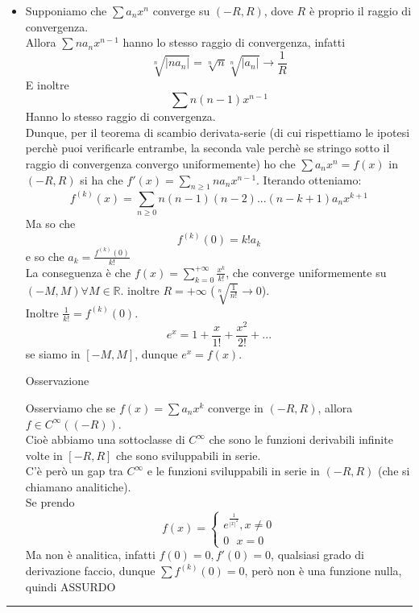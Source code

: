 \documentclass{article}
\theoremstyle{definition}
\newcommand{\linea}{\vspace{15pt}\hrule\vspace{15pt}}
\newcommand{\R}{\mathbb{R}}
\begin{document}
\begin{itemize}
    \item Supponiamo che $\sum a_nx^n$ converge su $(-R,R)$, dove $R$ è proprio il raggio di convergenza.\\
Allora $\sum na_nx^{n-1}$ hanno lo stesso raggio di convergenza, infatti
\begin{equation}
    \sqrt[n]{|na_n|}=\sqrt[n]{n}\sqrt[n]{|a_n|} \to \frac{1}{R}
\end{equation}
E inoltre
\begin{equation}
    \sum n(n-1)x^{n-1}
\end{equation}
Hanno lo stesso raggio di convergenza.
\\
Dunque, per il teorema di scambio derivata-serie (di cui rispettiamo le ipotesi perchè puoi verificarle entrambe, la seconda vale perchè se stringo sotto il raggio di convergenza convergo uniformemente) ho che $\sum a_nx^n = f(x)$ in $(-R,R)$ si ha che $f'(x)=\sum_{n \geqslant 1} n a_nx^{n-1}$. Iterando otteniamo:
\begin{equation}
    f^{(k)}(x)=\sum_{n \geqslant 0} n(n-1)(n-2)...(n-k+1)a_nx^{k+1}
\end{equation}
Ma so che 
\begin{equation}
    f^{(k)}(0)=k!a_k
\end{equation}
e so che $a_k=\frac{f^{(k)}(0)}{k!}$
\\
La conseguenza è che $f(x)=\sum_{k=0}^{+\infty}\frac{x^k}{k!}$, che converge uniformemente su $(-M,M) \forall M \in \R$. inoltre $R = +\infty$ ($\sqrt[n]{\frac{1}{n!}} \to 0$).
\\
Inoltre $\frac{1}{k!}=f^{(k)}(0)$.
\\
\begin{equation}
    e^x = 1+ \frac{x}{1!}+\frac{x^2}{2!}+...
\end{equation}
se siamo in $[-M,M]$, dunque $e^x=f(x)$.



\begin{center}
    Osservazione
\end{center}
Osserviamo che se $f(x)=\sum a_nx^k$ converge in $(-R,R)$, allora $f \in C^{\infty}((-R))$.
\\
Cioè abbiamo una sottoclasse di $C^{\infty}$ che sono le funzioni derivabili infinite volte in $[-R,R]$ che sono sviluppabili in serie.
\\
C'è però un gap tra $C^{\infty}$ e le funzioni sviluppabili in serie in $(-R,R)$ (che si chiamano analitiche).
\\
Se prendo
\begin{equation}
    f(x)=\begin{cases}
        e^{\frac{1}{|x|^2}}, x \neq 0 \\
        0 \,\,\,\, x=0
    \end{cases}    
\end{equation}
Ma non è analitica, infatti $f(0)=0, f'(0)=0$, qualsiasi grado di derivazione faccio, dunque $\sum f^{(k)}(0)=0$, però non è una funzione nulla, quindi ASSURDO



\end{itemize}
\linea
 \newpage
\end{document}
